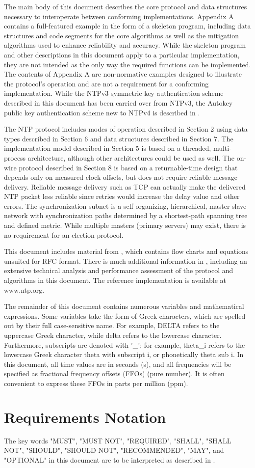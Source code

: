 The main body of this document describes the core protocol and data
structures necessary to interoperate between conforming
implementations. Appendix A contains a full-featured example in the
form of a skeleton program, including data structures and code
segments for the core algorithms as well as the mitigation algorithms
used to enhance reliability and accuracy. While the skeleton program
and other descriptions in this document apply to a particular
implementation, they are not intended as the only way the required
functions can be implemented. The contents of Appendix A are non-normative
examples designed to illustrate the protocol’s operation
and are not a requirement for a conforming implementation. While the
NTPv3 symmetric key authentication scheme described in this document
has been carried over from NTPv3, the Autokey public key
authentication scheme new to NTPv4 is described in \cite{RFC5906}.

The NTP protocol includes modes of operation described in Section 2
using data types described in Section 6 and data structures described
in Section 7. The implementation model described in Section 5 is
based on a threaded, multi-process architecture, although other
architectures could be used as well. The on-wire protocol described
in Section 8 is based on a returnable-time design that depends only
on measured clock offsets, but does not require reliable message
delivery. Reliable message delivery such as TCP \cite{RFC0793} can
actually make the delivered NTP packet less reliable since retries
would increase the delay value and other errors. The synchronization
subnet is a self-organizing, hierarchical, master-slave network with
synchronization paths determined by a shortest-path spanning tree and
defined metric. While multiple masters (primary servers) may exist,
there is no requirement for an election protocol.

This document includes material from \cite{ref9}, which contains flow
charts and equations unsuited for RFC format. There is much
additional information in \cite{ref7}, including an extensive technical
analysis and performance assessment of the protocol and algorithms in
this document. The reference implementation is available at
www.ntp.org.

The remainder of this document contains numerous variables and
mathematical expressions. Some variables take the form of Greek
characters, which are spelled out by their full case-sensitive name.
For example, DELTA refers to the uppercase Greek character, while
delta refers to the lowercase character. Furthermore, subscripts are
denoted with ’\_’; for example, theta\_i refers to the lowercase Greek
character theta with subscript i, or phonetically theta sub i. In
this document, all time values are in seconds (s), and all
frequencies will be specified as fractional frequency offsets (FFOs)
(pure number). It is often convenient to express these FFOs in parts
per million (ppm).

\section{Requirements Notation}

The key words "MUST", "MUST NOT", "REQUIRED", "SHALL", "SHALL NOT",
"SHOULD", "SHOULD NOT", "RECOMMENDED", "MAY", and "OPTIONAL" in this
document are to be interpreted as described in \cite{RFC2119}.
